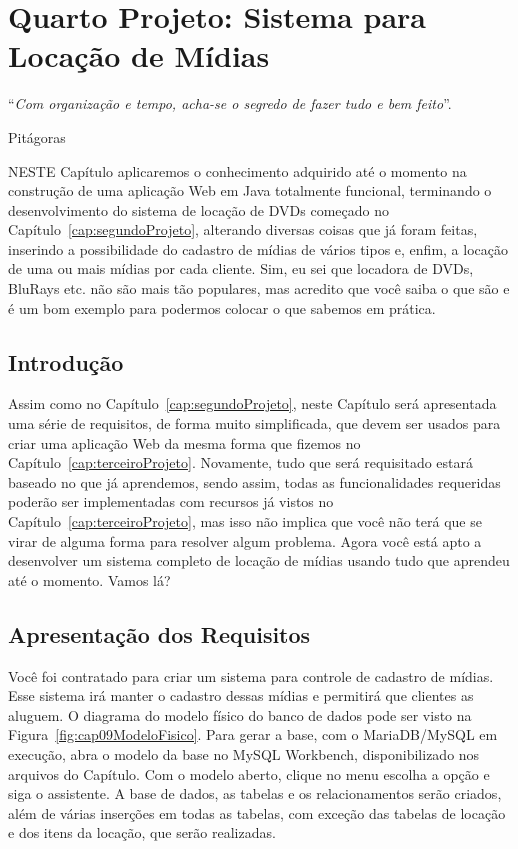 \chapter{Quarto Projeto: Sistema para Locação de Mídias}\label{cap:quartoProjeto}
\epigraph{``\textit{Com organização e tempo, acha-se o segredo de fazer tudo e bem feito}''.}{Pitágoras}

\lettrine[lines=4, lhang=0.1, lraise=0, loversize=0.2, findent=0.1em]{\textcolor{corTema}{N}}{ESTE} Capítulo aplicaremos o conhecimento adquirido até o momento na construção de uma aplicação Web em Java totalmente funcional, terminando o desenvolvimento do sistema de locação de DVDs começado no Capítulo~\ref{cap:segundoProjeto}, alterando diversas coisas que já foram feitas, inserindo a possibilidade do cadastro de mídias de vários tipos e, enfim, a locação de uma ou mais mídias por cada cliente. Sim, eu sei que locadora de DVDs, BluRays etc. não são mais tão populares, mas acredito que você saiba o que são e é um bom exemplo para podermos colocar o que sabemos em prática.


\section{Introdução}

Assim como no Capítulo~\ref{cap:segundoProjeto}, neste Capítulo será apresentada uma série de requisitos, de forma muito simplificada, que devem ser usados para criar uma aplicação Web da mesma forma que fizemos no Capítulo~\ref{cap:terceiroProjeto}. Novamente, tudo que será requisitado estará baseado no que já aprendemos, sendo assim, todas as funcionalidades requeridas poderão ser implementadas com recursos já vistos no Capítulo~\ref{cap:terceiroProjeto}, mas isso não implica que você não terá que se virar de alguma forma para resolver algum problema. Agora você está apto a desenvolver um sistema completo de locação de mídias usando tudo que aprendeu até o momento. Vamos lá?


\section{Apresentação dos Requisitos}

Você foi contratado para criar um sistema para controle de cadastro de mídias. Esse sistema irá manter o cadastro dessas mídias e permitirá que clientes as aluguem. O diagrama do modelo físico do banco de dados pode ser visto na Figura~\ref{fig:cap09ModeloFisico}. Para gerar a base, com o MariaDB/MySQL em execução, abra o modelo da base no MySQL Workbench, disponibilizado nos arquivos do Capítulo. Com o modelo aberto, clique no menu  escolha a opção  e siga o assistente. A base de dados, as tabelas e os relacionamentos serão criados, além de várias inserções em todas as tabelas, com exceção das tabelas de locação e dos itens da locação, que serão realizadas.

